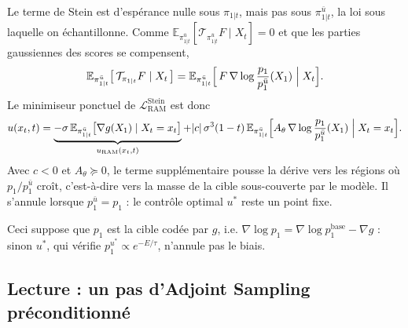 \documentclass[11pt]{article}
\newcommand{\E}{\mathbb{E}}
\newcommand{\ubar}{\bar u}
\newcommand{\pbase}{p^{\mathrm{base}}}
\begin{document}
Le terme de Stein est d'espérance nulle sous $\pi_{1|t}$, mais pas sous $\pi^{\ubar}_{1|t}$, la loi sous laquelle on échantillonne. Comme $\E_{\pi^{\ubar}_{1|t}}[\mathcal{T}_{\pi^{\ubar}_{1|t}} F \mid X_t] = 0$ et que les parties gaussiennes des scores se compensent,
\begin{equation}
\E_{\pi^{\ubar}_{1|t}}\bigl[\, \mathcal{T}_{\pi_{1|t}} F \mid X_t \,\bigr]
= \E_{\pi^{\ubar}_{1|t}}\Bigl[\, F\, \nabla \log \frac{p_1}{p_1^{\ubar}}(X_1) \;\Big|\; X_t \Bigr] .
\end{equation}
Le minimiseur ponctuel de $\mathcal{L}_{\mathrm{RAM}}^{\mathrm{Stein}}$ est donc
\begin{equation}
u(x_t,t)
= \underbrace{-\sigma\, \E_{\pi^{\ubar}_{1|t}}\bigl[ \nabla g(X_1) \mid X_t = x_t \bigr]}_{u_{\mathrm{RAM}}(x_t,t)}
+ |c|\, \sigma^3 (1-t)\,
\E_{\pi^{\ubar}_{1|t}}\Bigl[ A_\theta\, \nabla \log \frac{p_1}{p_1^{\ubar}}(X_1) \;\Big|\; X_t = x_t \Bigr].
\end{equation}
Avec $c<0$ et $A_\theta \succeq 0$, le terme supplémentaire pousse la dérive vers les régions où $p_1 / p_1^{\ubar}$ croît, c'est-à-dire vers la masse de la cible sous-couverte par le modèle. Il s'annule lorsque $p_1^{\ubar} = p_1$ : le contrôle optimal $u^*$ reste un point fixe.

Ceci suppose que $p_1$ est la cible codée par $g$, i.e. $\nabla \log p_1 = \nabla \log \pbase_1 - \nabla g$ : sinon $u^*$, qui vérifie $p_1^{u^*} \propto e^{-E/\tau}$, n'annule pas le biais.

\subsection{Lecture : un pas d'Adjoint Sampling préconditionné}
\end{document}
